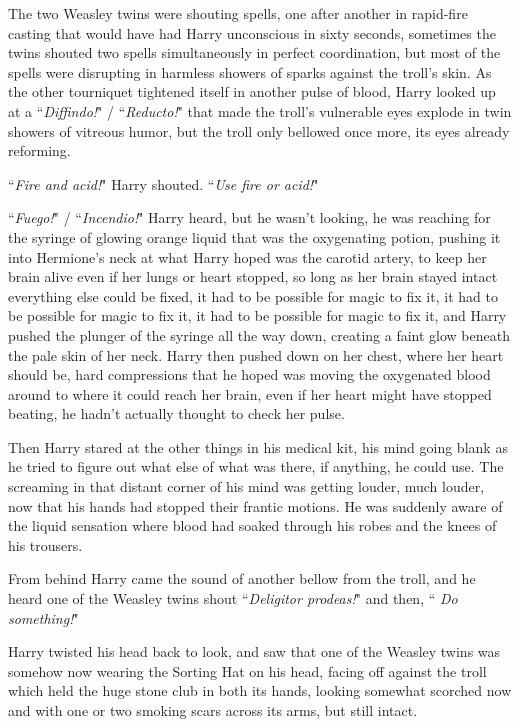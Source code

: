 The two Weasley twins were shouting spells, one after another in rapid-fire casting that would have had Harry unconscious in sixty seconds, sometimes the twins shouted two spells simultaneously in perfect coordination, but most of the spells were disrupting in harmless showers of sparks against the troll's skin. As the other tourniquet tightened itself in another pulse of blood, Harry looked up at a ``\emph{Diffindo!}" / ``\emph{Reducto!}" that made the troll's vulnerable eyes explode in twin showers of vitreous humor, but the troll only bellowed once more, its eyes already reforming.

``\emph{Fire and acid!}" Harry shouted. ``\emph{Use fire or acid!}"

``\emph{Fuego!}" / ``\emph{Incendio!}" Harry heard, but he wasn't looking, he was reaching for the syringe of glowing orange liquid that was the oxygenating potion, pushing it into Hermione's neck at what Harry hoped was the carotid artery, to keep her brain alive even if her lungs or heart stopped, so long as her brain stayed intact everything else could be fixed, it had to be possible for magic to fix it, it had to be possible for magic to fix it, it had to be possible for magic to fix it, and Harry pushed the plunger of the syringe all the way down, creating a faint glow beneath the pale skin of her neck. Harry then pushed down on her chest, where her heart should be, hard compressions that he hoped was moving the oxygenated blood around to where it could reach her brain, even if her heart might have stopped beating, he hadn't actually thought to check her pulse.

Then Harry stared at the other things in his medical kit, his mind going blank as he tried to figure out what else of what was there, if anything, he could use. The screaming in that distant corner of his mind was getting louder, much louder, now that his hands had stopped their frantic motions. He was suddenly aware of the liquid sensation where blood had soaked through his robes and the knees of his trousers.

From behind Harry came the sound of another bellow from the troll, and he heard one of the Weasley twins shout ``\emph{Deligitor prodeas!}" and then, ``\emph{ Do something!}"

Harry twisted his head back to look, and saw that one of the Weasley twins was somehow now wearing the Sorting Hat on his head, facing off against the troll which held the huge stone club in both its hands, looking somewhat scorched now and with one or two smoking scars across its arms, but still intact.

